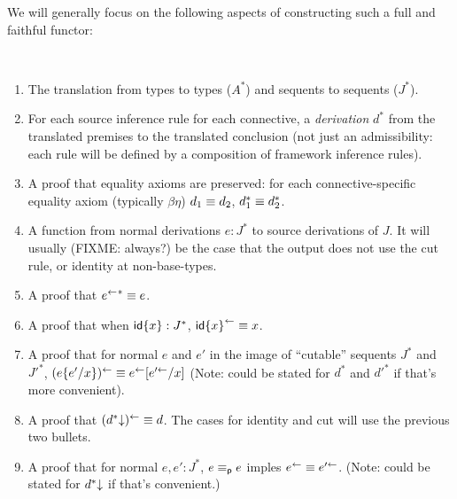 We will generally focus on the following aspects of constructing such a
full and faithful functor:
\begin{definition} ~
\begin{enumerate}
\item The translation from types to types ($A^*$) and sequents to
  sequents ($J^*$).

\item For each source inference rule for each connective, a
  \emph{derivation} $d^*$ from the translated premises to the translated
  conclusion (not just an admissibility: each rule will be defined by a
  composition of framework inference rules).

\item A proof that equality axioms are preserved: for each
  connective-specific equality axiom (typically $\beta\eta$) $d_1 \equiv
  d_2$, $d_1^* \equiv d_2^*$.

\item A function \backtrf{-} from normal derivations $e : J^*$ to source
  derivations of $J$.  It will usually (FIXME: always?) be the case that
  the output does not use the cut rule, or identity at non-base-types.  

\item A proof that ${e^{\leftarrow}}^* \equiv e$.  

\item A proof that when ${\mathsf{id}\{x\}} : J^*$, ${\mathsf{id}\{x\}}^{\leftarrow} \equiv
  x$.

\item A proof that for normal $e$ and $e'$ in the image of ``cutable''
  sequents $J^*$ and $J'^*$, $(e\{e'/x\})^{\leftarrow} \equiv
  e^{\leftarrow}[e'^{\leftarrow}/x]$ (Note: could be stated for $d^*$ and
  $d'^*$ if that's more convenient).  

\item A proof that $(d^*\mathord{\downarrow})^{\leftarrow} \equiv d$.  The cases for
  identity and cut will use the previous two bullets.

\item A proof that for normal $e,e' : J^*$, $e \equiv_{\mathsf{p}} e$ imples
  $e^{\leftarrow} \equiv e'^{\leftarrow}$.  (Note: could be stated for
  $d^*\mathord{\downarrow}$ if that's convenient.)
\end{enumerate}
\end{definition}

